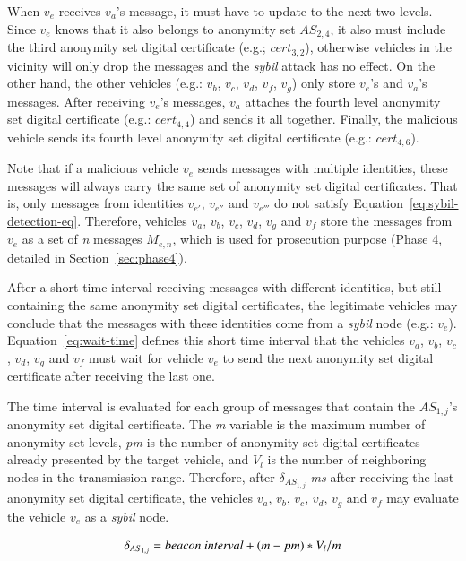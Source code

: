 \documentclass[preprint,12pt]{elsarticle}
\begin{document}
When $v_{e}$ receives $v_{a}$'s message, it must have to update to the next two levels. Since $v_{e}$ knows that it also belongs to anonymity set $AS_{2, 4}$, it also must include the third anonymity set digital certificate (e.g.; $cert_{3, 2}$), otherwise vehicles in the vicinity will only drop the messages and the \textit{sybil} attack has no effect. On the other hand, the other vehicles (e.g.: $v_{b}$, $v_{c}$, $v_{d}$, $v_{f}$, $v_{g}$) only store $v_{e}$'s and $v_{a}$'s messages. After receiving $v_{e}$'s messages, $v_{a}$ attaches the fourth level anonymity set digital certificate (e.g.: $cert_{4, 4}$) and sends it all together. Finally, the malicious vehicle sends its fourth level anonymity set digital certificate (e.g.: $cert_{4,6}$).

Note that if a malicious vehicle $v_{e}$ sends messages with multiple identities, these messages will always carry the same set of anonymity set digital certificates. That is, only messages from identities $v_{e'}$, $v_{e''}$ and $v_{e'''}$ do not satisfy Equation~\ref{eq:sybil-detection-eq}. Therefore, vehicles $v_{a}$, $v_{b}$, $v_{c}$, $v_{d}$, $v_{g}$ and $v_{f}$ store the messages from $v_{e}$ as a set of \textit{n} messages $M_{e, n}$, which is used for prosecution purpose (Phase 4, detailed in Section~\ref{sec:phase4}).

After a short time interval receiving messages with different identities, but still containing the same anonymity set digital certificates, the legitimate vehicles may conclude that the messages with these identities come from a \textit{sybil} node (e.g.: $v_{e}$). Equation~\ref{eq:wait-time} defines this short time interval that the vehicles $v_{a}$, $v_{b}$, $v_{c}$, $v_{d}$, $v_{g}$ and $v_{f}$ must wait for vehicle $v_{e}$ to send the next anonymity set digital certificate after receiving the last one.

The time interval is evaluated for each group of messages that contain the $AS_{1, j}$'s anonymity set digital certificate. The \textit{m} variable is the maximum number of anonymity set levels, \textit{pm} is the number of anonymity set digital certificates already presented by the target vehicle, and $V_{l}$ is the number of neighboring nodes in the transmission range. Therefore, after $\delta_{AS_{1,j}}$ \textit{ms} after receiving the last anonymity set digital certificate, the vehicles $v_{a}$, $v_{b}$, $v_{c}$, $v_{d}$, $v_{g}$ and $v_{f}$ may evaluate the vehicle $v_{e}$ as a \textit{sybil} node.

\begin{equation}
\label{eq:wait-time}
\delta_{AS_{1,j}}  = \textit{\text{beacon interval}} + (m - pm) * V_{l} / m
\end{equation}
\end{document}
